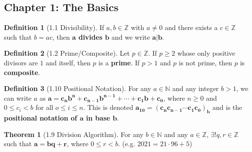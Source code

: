 \documentclass{article}
\newcommand{\Z}{\ensuremath{\mathbb{Z}}}
\newcommand{\N}{\ensuremath{\mathbb{N}}}
\theoremstyle{definition}
\newtheorem*{defn}{Definition}
\newtheorem*{thm}{Theorem}
\theoremstyle{remark}
\begin{document}
    \subsection*{Chapter 1: The Basics}{
        \begin{defn}[1.1 Divisibility]
            If $a,b \in \Z$ with $a\neq0$ and there exists a $c \in \Z$ such that $b=ac$, then \textbf{$\mathbf{a}$ divides $\mathbf{b}$} and we write $\mathbf{a|b}$.
        \end{defn}
        
        \begin{defn}[1.2 Prime/Composite]
            Let $p \in \Z$. If $p\geq 2$ whose only positive divisors are $1$ and itself, then $p$ is a \textbf{prime}. If $p>1$ and $p$ is not prime, then $p$ is \textbf{composite}.
        \end{defn}
        
        \begin{defn}[1.10 Positional Notation]
            For any $a \in \N$ and any integer $b>1$, we can write $a$ as $\mathbf{a=c_nb^n+c_{n-1}b^{n-1}+\cdots+c_1b+c_0}$, where $n\geq0$ and $0\leq c_i<b$ for all $o\leq i\leq n$. This is denoted $\mathbf{a_{10}=(c_nc_{n-1}\cdots c_1c_0)_b}$ and is the \textbf{positional notation of $\mathbf{a}$ in base $\mathbf{b}$}.
        \end{defn}
        
        \begin{thm}[1.9 Division Algorithm]
            For any $b \in \N$ and any $a \in \Z$, $\exists! q,r \in \Z$ such that $\mathbf{a=bq+r}$, where $0\leq r< b$. (e.g. $2021=21\cdot96+5$)
        \end{thm}
    }
    
\end{document}
